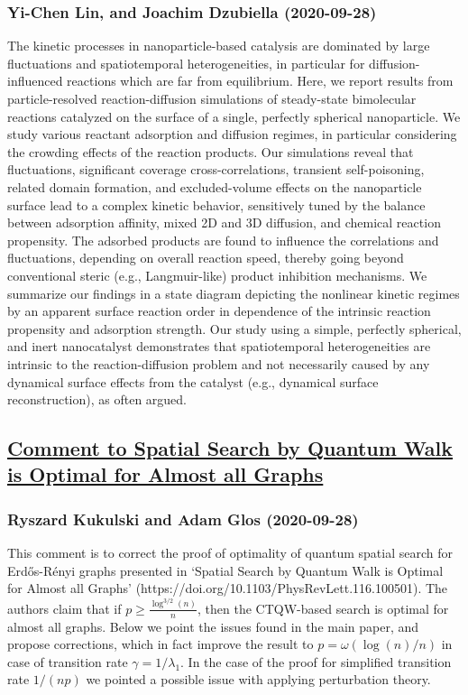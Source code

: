 \subsubsection*{Yi-Chen Lin, and Joachim Dzubiella (2020-09-28)}
The kinetic processes in nanoparticle-based catalysis are dominated by large
fluctuations and spatiotemporal heterogeneities, in particular for
diffusion-influenced reactions which are far from equilibrium. Here, we report
results from particle-resolved reaction-diffusion simulations of steady-state
bimolecular reactions catalyzed on the surface of a single, perfectly spherical
nanoparticle. We study various reactant adsorption and diffusion regimes, in
particular considering the crowding effects of the reaction products. Our
simulations reveal that fluctuations, significant coverage cross-correlations,
transient self-poisoning, related domain formation, and excluded-volume effects
on the nanoparticle surface lead to a complex kinetic behavior, sensitively
tuned by the balance between adsorption affinity, mixed 2D and 3D diffusion,
and chemical reaction propensity. The adsorbed products are found to influence
the correlations and fluctuations, depending on overall reaction speed, thereby
going beyond conventional steric (e.g., Langmuir-like) product inhibition
mechanisms. We summarize our findings in a state diagram depicting the
nonlinear kinetic regimes by an apparent surface reaction order in dependence
of the intrinsic reaction propensity and adsorption strength. Our study using a
simple, perfectly spherical, and inert nanocatalyst demonstrates that
spatiotemporal heterogeneities are intrinsic to the reaction-diffusion problem
and not necessarily caused by any dynamical surface effects from the catalyst
(e.g., dynamical surface reconstruction), as often argued.

\subsection*{\href{http://arxiv.org/abs/2009.13309v1}{Comment to Spatial Search by Quantum Walk is Optimal for Almost all  Graphs}}
\subsubsection*{Ryszard Kukulski and Adam Glos (2020-09-28)}
This comment is to correct the proof of optimality of quantum spatial search
for Erd\H{o}s-R\'enyi graphs presented in `Spatial Search by Quantum Walk is
Optimal for Almost all Graphs'
(https://doi.org/10.1103/PhysRevLett.116.100501). The authors claim that if
$p\geq \frac{\log^{3/2}(n)}{n}$, then the CTQW-based search is optimal for
almost all graphs. Below we point the issues found in the main paper, and
propose corrections, which in fact improve the result to $p=\omega(\log(n)/n)$
in case of transition rate $\gamma = 1/\lambda_1$. In the case of the proof for
simplified transition rate $1/(np)$ we pointed a possible issue with applying
perturbation theory.

